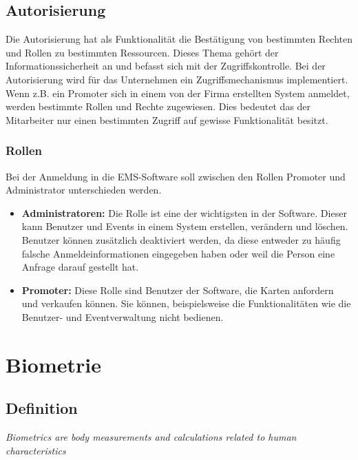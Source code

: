\subsection{Autorisierung}
Die Autorisierung hat als Funktionalität die Bestätigung von bestimmten Rechten und Rollen zu bestimmten Ressourcen. Dieses Thema gehört der Informationssicherheit an und befasst sich mit der Zugriffskontrolle. Bei der Autorisierung wird für das Unternehmen ein Zugriffsmechanismus implementiert. Wenn z.B. ein Promoter sich in einem von der Firma erstellten System anmeldet, werden bestimmte Rollen und Rechte zugewiesen. Dies bedeutet das der Mitarbeiter nur einen bestimmten Zugriff auf gewisse Funktionalität besitzt.

\subsubsection{Rollen}
Bei der Anmeldung in die EMS-Software soll zwischen den Rollen Promoter und Administrator unterschieden werden. 
\begin{itemize}
	\item \textbf{Administratoren:} Die Rolle ist eine der wichtigsten in der Software. Dieser kann Benutzer und Events in einem System erstellen, verändern und löschen. Benutzer können zusätzlich deaktiviert werden, da diese entweder zu häufig falsche Anmeldeinformationen eingegeben haben oder weil die Person eine Anfrage darauf gestellt hat.
	\item \textbf{Promoter:} Diese Rolle sind Benutzer der Software, die Karten anfordern und verkaufen können. Sie können, beispielsweise die Funktionalitäten wie die Benutzer- und Eventverwaltung nicht bedienen.
\end{itemize}

\section{Biometrie}
\subsection{Definition}
\begin{center}
	\textit{Biometrics are body measurements and calculations related to human characteristics}
\end{center}

